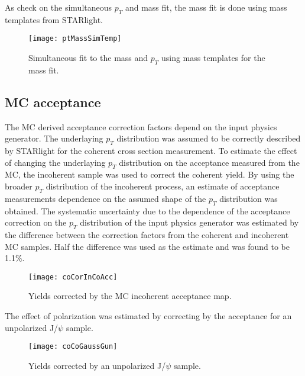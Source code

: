       As check on the simultaneous $p_{T}$ and mass fit, the mass fit is done
        using mass templates from STARlight.
      \begin{figure}[!Hhbt]
        \centering
        \texttt{[image: ptMassSimTemp]}
        \caption{Simultaneous fit to the mass and $p_{T}$ using mass templates
          for the mass fit. }
        \label{fig:simFitTemp}
      \end{figure}

    \subsection{MC acceptance}
      The MC derived acceptance correction factors depend on the input physics
        generator. 
      The underlaying $p_{T}$ distribution was assumed to be correctly 
        described by STARlight for the coherent cross section measurement.
      To estimate the effect of changing the underlaying $p_{T}$ distribution 
        on the acceptance measured from the MC, the incoherent sample was used 
        to correct the coherent yield.
      By using the broader $p_{T}$ distribution of the incoherent process, an 
        estimate of acceptance measurements dependence on the assumed shape of
        the $p_{T}$ distribution was obtained.
      The systematic uncertainty due to the dependence of the acceptance 
        correction on the $p_{T}$ distribution of the input physics generator
        was estimated by the difference between the correction factors from 
        the coherent and incoherent MC samples. 
      Half the difference was used as the estimate and was found to be 1.1\%.

      \begin{figure}[!Hhbt]
        \centering
        \texttt{[image: coCorInCoAcc]}
        \caption{Yields corrected by the MC incoherent acceptance map.}
        \label{fig:coYieldInCoCor}
      \end{figure}

      The effect of polarization was estimated by correcting by the acceptance
        for an unpolarized J/$\psi$ sample.
      \begin{figure}[!Hhtb]
        \centering
        \texttt{[image: coCoGaussGun]}
        \caption{Yields corrected by an unpolarized J/$\psi$ sample.}
        \label{fig:coYieldGaussCor}
      \end{figure}

